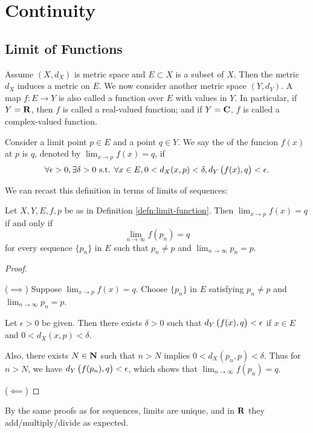 \chapter{Continuity}\label{chap:real-analysis_continuity}
\section{Limit of Functions}
Assume $(X,d_X)$ is metric space and $E\subset X$ is a subset of $X$. Then the metric $d_X$ induces a metric on $E$. We now consider another metric space $(Y,d_Y)$. A map $f:E\to Y$ is also called a function over $E$ with values in $Y$. In particular, if $Y=\mathbf R$, then $f$ is called a real-valued function; and if $Y=\mathbf C$, $f$ is called a complex-valued function.

\begin{definition}\label{defn:limit-function}
Consider a limit point $p\in E$ and a point $q\in Y$. We say the  of the funcion $f(x)$ at $p$ is $q$, denoted by $\lim_{x\to p}f(x)=q$, if
\[\forall\epsilon>0, \exists\delta>0\text{ s.t. }\forall x\in E, 0<d_X(x,p)<\delta, d_Y\left(f(x),q\right)<\epsilon.\]
\end{definition}

We can recast this definition in terms of limits of sequences:
\begin{proposition}
Let $X,Y,E,f,p$ be as in Definition \ref{defn:limit-function}. Then $\displaystyle\lim_{x\to p}f(x)=q$ if and only if
\[\lim_{n\to\infty}f(p_n)=q\]
for every sequence $\{p_n\}$ in $E$ such that $p_n \neq p$ and $\displaystyle\lim_{n\to\infty}p_n=p$.
\end{proposition}

\begin{proof} \

($\implies$) Suppose $\displaystyle\lim_{x\to p}f(x)=q$. Choose $\{p_n\}$ in $E$ satisfying $p_n \neq p$ and $\displaystyle\lim_{n\to\infty}p_n=p$.

Let $\epsilon>0$ be given. Then there exists $\delta>0$ such that $d_Y\left(f(x),q\right)<\epsilon$ if $x\in E$ and $0<d_X(x,p)<\delta$.

Also, there exists $N\in\mathbf N$ such that $n>N$ implies $0<d_X(p_n,p)<\delta$. Thus for $n>N$, we have $d_Y\left(f(p_n),q\right)<\epsilon$, which shows that $\displaystyle\lim_{n\to\infty}f(p_n)=q$.

($\impliedby$) 
\end{proof}

By the same proofs as for sequences, limits are unique, and in $\mathbf R$ they add/multiply/divide as expected.


